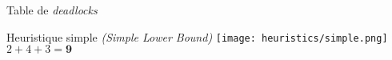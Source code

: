          \begin{frame}{Table de \textit{deadlocks}}
        \end{frame}

        \begin{frame}{Heuristique simple \textit{(Simple Lower Bound)}}
            \centering%
            \texttt{[image: heuristics/simple.png]}
            \Large$\boxed{2 + 4 + 3 = \mathbf{9}}$
        \end{frame}

